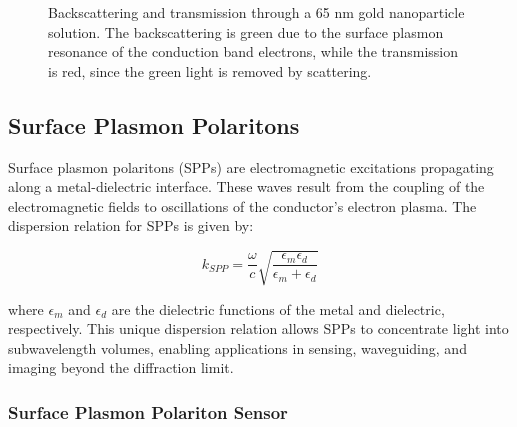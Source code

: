 \documentclass[
  a4paper,
]{book}
\begin{document}
\begin{figure}


\caption{\label{fig-np-gold}Backscattering and transmission through a 65
nm gold nanoparticle solution. The backscattering is green due to the
surface plasmon resonance of the conduction band electrons, while the
transmission is red, since the green light is removed by scattering.}

\end{figure}%

\subsection{Surface Plasmon
Polaritons}\label{surface-plasmon-polaritons}

Surface plasmon polaritons (SPPs) are electromagnetic excitations
propagating along a metal-dielectric interface. These waves result from
the coupling of the electromagnetic fields to oscillations of the
conductor's electron plasma. The dispersion relation for SPPs is given
by:

\[
k_{SPP} = \frac{\omega}{c}\sqrt{\frac{\epsilon_m\epsilon_d}{\epsilon_m + \epsilon_d}}
\]

where \(\epsilon_m\) and \(\epsilon_d\) are the dielectric functions of
the metal and dielectric, respectively. This unique dispersion relation
allows SPPs to concentrate light into subwavelength volumes, enabling
applications in sensing, waveguiding, and imaging beyond the diffraction
limit.

\subsubsection{Surface Plasmon Polariton
Sensor}\label{surface-plasmon-polariton-sensor}
\end{document}
